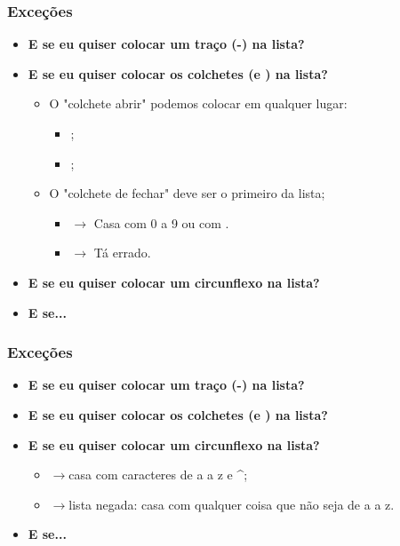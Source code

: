 \begin{frame}
	\frametitle{Exceções}
	
	\begin{itemize}
		\item \textbf{E se eu quiser colocar um traço (-) na lista?}
		\item \textbf{E se eu quiser colocar os colchetes (\lcol  e \rcol) na lista?}
		\begin{itemize}
			\item O "colchete abrir" podemos colocar em qualquer lugar:
			\begin{itemize}
				\item {};
				\item {};
			\end{itemize}
			\item O "colchete de fechar" deve ser o primeiro da lista;
			\begin{itemize}
				\item {} $\rightarrow$ Casa com 0 a 9 ou com \rcol.
				\item {} $\rightarrow$ Tá errado.
			\end{itemize}
		\end{itemize}
		\item \textbf{E se eu quiser colocar um circunflexo na lista?}
		\item \textbf{E se...}
	\end{itemize}

\end{frame}

\begin{frame}
	\frametitle{Exceções}
	
	\begin{itemize}
		\item \textbf{E se eu quiser colocar um traço (-) na lista?}
		\item \textbf{E se eu quiser colocar os colchetes (\lcol  e \rcol) na lista?}
		\item \textbf{E se eu quiser colocar um circunflexo na lista?}
			\begin{itemize}
				\item {}$\rightarrow$casa com caracteres de a a z e \textasciicircum;
				\item {}$\rightarrow$lista negada: casa com qualquer coisa que não seja de a a z.
			\end{itemize}
		\item \textbf{E se...}
	\end{itemize}

\end{frame}

